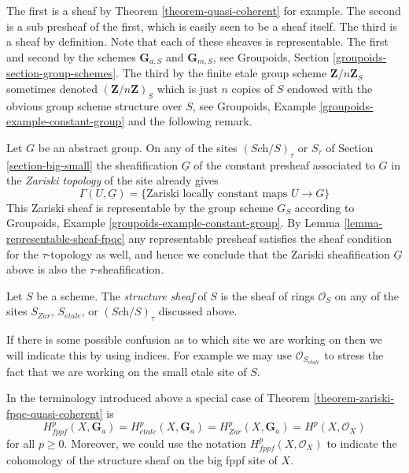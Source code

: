 \noindent
The first is a sheaf by
Theorem \ref{theorem-quasi-coherent}
for example. The second is a sub presheaf of the first, which is easily seen
to be a sheaf itself. The third is a sheaf by definition.
Note that each of these sheaves is representable.
The first and second by the schemes $\mathbf{G}_{a, S}$ and
$\mathbf{G}_{m, S}$, see
Groupoids, Section \ref{groupoids-section-group-schemes}.
The third by the finite etale group scheme $\mathbf{Z}/n\mathbf{Z}_S$
sometimes denoted $(\mathbf{Z}/n\mathbf{Z})_S$
which is just $n$ copies of $S$ endowed
with the obvious group scheme structure over $S$, see
Groupoids, Example \ref{groupoids-example-constant-group}
and the following remark.

\begin{remark}
\label{remark-constant-locally-constant-maps}
Let $G$ be an abstract group.
On any of the sites $(\textit{Sch}/S)_\tau$ or $S_\tau$ of
Section \ref{section-big-small}
the sheafification $\underline{G}$
of the constant presheaf associated to $G$ in the
{\it Zariski topology} of the site already gives 
$$
\Gamma(U, \underline{G}) =
\{\text{Zariski locally constant maps }U \to G\}
$$
This Zariski sheaf is representable by the group scheme $G_S$ according to 
Groupoids, Example \ref{groupoids-example-constant-group}.
By
Lemma \ref{lemma-representable-sheaf-fpqc}
any representable presheaf satisfies the sheaf condition for the
$\tau$-topology as well, and hence we conclude that the Zariski
sheafification $\underline{G}$ above is also the $\tau$-sheafification.
\end{remark}

\begin{definition}
\label{definition-structure-sheaf}
Let $S$ be a scheme. The {\it structure sheaf} of $S$ is the sheaf of rings
$\mathcal{O}_S$
on any of the sites $S_{Zar}$, $S_{etale}$, or $(\textit{Sch}/S)_\tau$
discussed above.
\end{definition}

\noindent
If there is some possible confusion as to which site we are working on
then we will indicate this by using indices. For example we may use
$\mathcal{O}_{S_{etale}}$ to stress the fact that we are working on the
small etale site of $S$.

\begin{remark}
\label{remark-special-case-fpqc-cohomology-quasi-coherent}
In the terminology introduced above a special case of
Theorem \ref{theorem-zariski-fpqc-quasi-coherent}
is
$$
H_{fppf}^p(X, \mathbf{G}_a) =
H_{etale}^p(X, \mathbf{G}_a) =
H_{Zar}^p(X, \mathbf{G}_a) =
H^p(X, \mathcal{O}_X)
$$
for all $p \geq 0$. Moreover, we could use the notation
$H^p_{fppf}(X, \mathcal{O}_X)$ to indicate the cohomology of the
structure sheaf on the big fppf site of $X$.
\end{remark}




